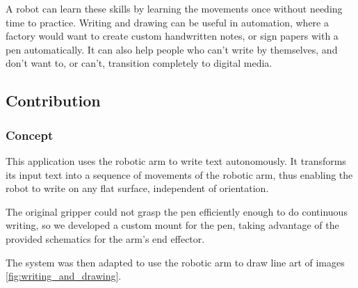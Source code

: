 A robot can learn these skills by learning the movements once without needing time to practice. Writing and drawing can be useful in automation, where a factory would want to create custom handwritten notes, or sign papers with a pen automatically. It can also help people who can't write by themselves, and don't want to, or can't, transition completely to digital media.





\subsection{Contribution}

\subsubsection{Concept}

This application uses the robotic arm to write text autonomously. It transforms its input text into a sequence of movements of the robotic arm, thus enabling the robot to write on any flat surface, independent of orientation.

The original gripper could not grasp the pen efficiently enough to do continuous writing, so we developed a custom mount for the pen, taking advantage of the provided schematics for the arm's end effector.


The system was then adapted to use the robotic arm to draw line art of images \ref{fig:writing_and_drawing}.

